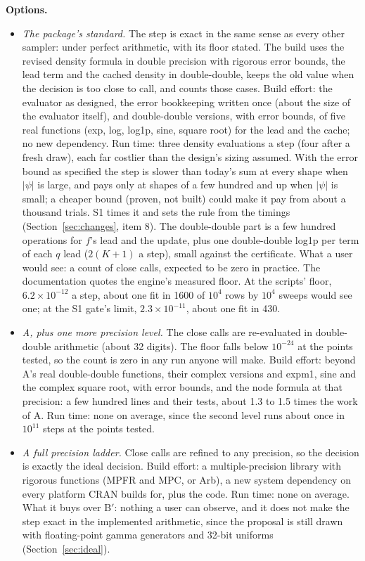 \textbf{Options.}
\begin{itemize}
\item[A.] \emph{The package's standard.} The step is exact in the same sense as every other sampler: under perfect
arithmetic, with its floor stated. The build uses the revised density formula in double precision with rigorous
error bounds, the lead term and the cached density in double-double, keeps the old value when the decision is too
close to call, and counts those cases. Build effort: the evaluator as designed, the error bookkeeping written once
(about the size of the evaluator itself), and double-double versions, with error bounds, of five real functions
(exp, log, log1p, sine, square root) for the lead and the cache; no new dependency. Run time: three density
evaluations a step (four after a fresh draw), each far costlier than the design's sizing assumed. With the error
bound as specified the step is slower than today's sum at every shape when $|\psi|$ is large, and pays only at
shapes of a few hundred and up when $|\psi|$ is small; a cheaper bound (proven, not built) could make it pay from
about a thousand trials. S1 times it and sets the rule from the timings (Section~\ref{sec:changes}, item 8). The
double-double part is a few hundred operations for $f$'s lead and the update, plus one double-double log1p per
term of each $q$ lead ($2(K+1)$ a step), small against the certificate. What a user would see: a count of close
calls, expected to be zero in practice. The documentation quotes the engine's measured floor. At the scripts'
floor, $6.2\times10^{-12}$ a step, about one fit in 1600 of $10^4$ rows by $10^4$ sweeps would see one; at the
S1 gate's limit, $2.3\times10^{-11}$, about one fit in 430.
\item[B$'$.] \emph{A, plus one more precision level.} The close calls are re-evaluated in double-double
arithmetic (about 32 digits). The floor falls below $10^{-24}$ at the points tested, so the count is zero in any
run anyone will make. Build effort: beyond A's real double-double functions, their complex versions and expm1,
sine and the complex square root, with error bounds, and the node formula at that precision: a few hundred lines
and their tests, about 1.3 to 1.5 times the work of A. Run time: none on average, since the second level runs
about once in $10^{11}$ steps at the points tested.
\item[B.] \emph{A full precision ladder.} Close calls are refined to any precision, so the decision is exactly the
ideal decision. Build effort: a multiple-precision library with rigorous functions (MPFR and MPC, or Arb), a new
system dependency on every platform CRAN builds for, plus the code. Run time: none on average. What it buys over
B$'$: nothing a user can observe, and it does not make the step exact in the implemented arithmetic, since the
proposal is still drawn with floating-point gamma generators and 32-bit uniforms (Section~\ref{sec:ideal}).
\end{itemize}


